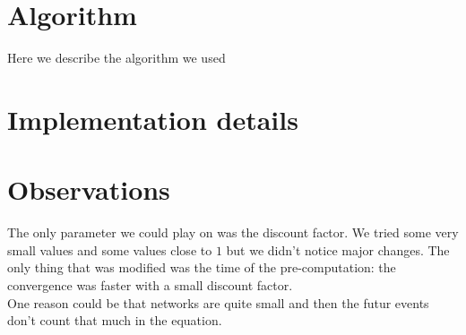 \documentclass[fontsize=11pt]{scrartcl} %
\begin{document}
\section*{Algorithm}
Here we describe the algorithm we used
\section*{Implementation details}


\section*{Observations}
The only parameter we could play on was the discount factor. We tried some very small values and some values close to $1$ but we didn't notice major changes. The only thing that was modified was the time of the pre-computation: the convergence was faster with a small discount factor.\\
One reason could be that networks are quite small and then the futur events don't count that much in the equation.
\end{document}
